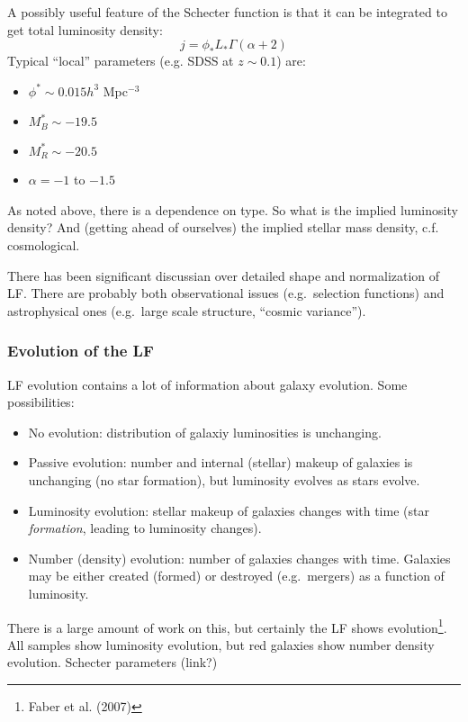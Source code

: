 \documentclass{article}
\newcommand{\mynotes}[1]{\textcolor{cadmiumgreen}{#1}}
\begin{document}
A possibly useful feature of the Schecter function is that it can be
integrated to get total luminosity density:
\[
    j = \phi_{*}L_{*}\Gamma\left(\alpha + 2\right)
\]
Typical ``local'' parameters (e.g. SDSS at $z\sim0.1$) are:
\begin{itemize}
    \item $\phi^{*}\sim0.015h^{3}$ Mpc$^{-3}$
    \item $M_{B}^{*}\sim-19.5$
    \item $M_{R}^{*}\sim-20.5$
    \item $\alpha=-1$ to $-1.5$
\end{itemize}
As noted above, there is a dependence on type. So what is the implied
luminosity density? And (getting ahead of ourselves) the implied stellar
mass density, c.f. cosmological.

There has been significant discussian over detailed shape and normalization of
LF\@.  There are probably both observational issues (e.g.\ selection functions)
and astrophysical ones (e.g.\ large scale structure, ``cosmic variance'').

\subsubsection{Evolution of the LF}
LF evolution contains a lot of information about galaxy evolution.
Some possibilities:
\begin{itemize}
    \item No evolution: distribution of galaxiy luminosities is unchanging.
    \item Passive evolution: number and internal (stellar) makeup of
        galaxies is unchanging \mynotes{(no star formation)},
        but luminosity evolves as stars evolve.
    \item Luminosity evolution: stellar makeup of galaxies changes with
        time (star \emph{formation}, leading to luminosity changes).
    \item Number (density) evolution: number of galaxies changes with time.
        Galaxies may be either created (formed) or destroyed (e.g.\
        mergers) as a function of luminosity.
\end{itemize}
There is a large amount of work on this, but certainly the LF shows
evolution\footnote{Faber et al. (2007)}. All samples show luminosity
evolution, but red galaxies show number density evolution.
Schecter parameters (link?)
\end{document}
